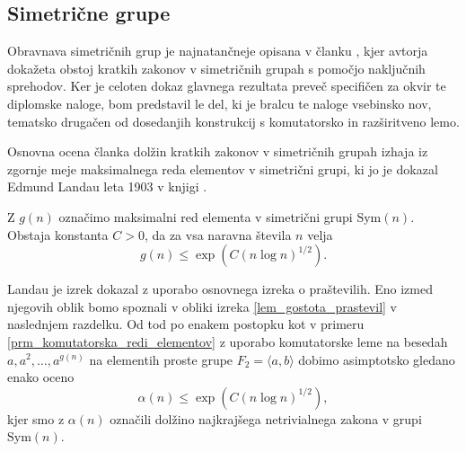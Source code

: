 \subsection{Simetrične grupe}\label{sec_simetricne_grupe}


Obravnava simetričnih grup je najnatančneje opisana v članku \cite{Kozma_Thom_2016}, kjer avtorja dokažeta obstoj kratkih zakonov v simetričnih grupah s pomočjo naključnih sprehodov.
Ker je celoten dokaz glavnega rezultata preveč specifičen za okvir te diplomske naloge, bom predstavil le del, ki je bralcu te naloge vsebinsko nov, tematsko drugačen od dosedanjih konstrukcij s komutatorsko in razširitveno lemo.

Osnovna ocena članka \cite{Kozma_Thom_2016} dolžin kratkih zakonov v simetričnih grupah izhaja iz zgornje meje maksimalnega reda elementov v simetrični grupi,
ki jo je dokazal Edmund Landau leta 1903 v knjigi \cite{Landau_1903}.

\begin{trditev}[Landau] \label{trd_landau}
    Z $g(n)$ označimo maksimalni red elementa v simetrični grupi $\text{Sym}(n)$. Obstaja konstanta $C > 0$, da za vsa naravna števila $n$ velja \begin{equation*}
        g(n) \le \exp(C (n \log n)^{1 / 2}).
    \end{equation*}
\end{trditev}
Landau je izrek dokazal z uporabo osnovnega izreka o praštevilih. Eno izmed njegovih oblik bomo spoznali v obliki izreka \ref{lem_gostota_prastevil} v naslednjem razdelku.  
Od tod po enakem postopku kot v primeru \ref{prm_komutatorska_redi_elementov} z uporabo komutatorske leme na besedah $a, a^2, \ldots, a^{g(n)}$ na elementih proste grupe $F_2 = \langle a, b \rangle$ dobimo asimptotsko gledano enako oceno \begin{equation*}
    \alpha(n)  \le \exp(C (n \log n)^{1 / 2}),
\end{equation*}  
kjer smo z $\alpha(n)$ označili dolžino najkrajšega netrivialnega zakona v grupi $\text{Sym}(n)$.

